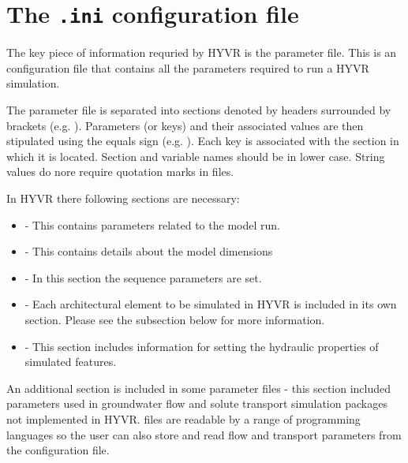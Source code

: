 \documentclass[letterpaper,10pt,english]{sphinxmanual}
\begin{document}
\section{The \texttt{.ini} configuration file}
\label{example:the-ini-configuration-file}
The key piece of information requried by HYVR is the parameter file. This is an  configuration file that contains all the parameters required to run a HYVR simulation.

The parameter file is separated into sections denoted by headers surrounded by brackets (e.g. ). Parameters (or keys) and their associated values are then stipulated using the equals sign (e.g. ). Each key is associated with the section in which it is located. Section and variable names should be in lower case. String values do nore require quotation marks in  files.

In HYVR there following sections are necessary:
\begin{itemize}
\item {} 
\sphinxcode{{[}run{]}} - This contains parameters related to the model run.

\item {} 
\sphinxcode{{[}model{]}} - This contains details about the model dimensions

\item {} 
\sphinxcode{{[}sequences{]}} - In this section the sequence parameters are set.

\item {} 
 - Each architectural element to be simulated in HYVR is included in its own section. Please see the subsection below for more information.

\item {} 
\sphinxcode{{[}hydraulics{]}} - This section includes information for setting the hydraulic properties of simulated features.

\end{itemize}

An additional section \sphinxcode{{[}flowtrans{]}} is included in some parameter files - this section included parameters used in groundwater flow and solute transport simulation packages not implemented in HYVR.  files are readable by a range of programming languages so the user can also store and read flow and transport parameters from the configuration file.
\end{document}
